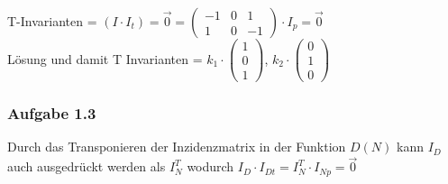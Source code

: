 \documentclass[10pt]{scrartcl}
\begin{document}
		T-Invarianten = $(I \cdotp I_t) = \overrightarrow{0} = \begin{pmatrix} 
						 -1 & 0 & 1 \\
						 1 & 0 & -1 \end{pmatrix} \cdotp I_p = \overrightarrow{0}$\\
		
		Lösung und damit T Invarianten = $k_1 \cdotp \begin{pmatrix} 
						 1 \\
						 0 \\
						 1 \end{pmatrix}$, $k_2 \cdotp \begin{pmatrix} 
						 0 \\
						 1 \\
						 0 \end{pmatrix}$\\
						 
	\subsubsection{Aufgabe 1.3}
	Durch das Transponieren der Inzidenzmatrix in der Funktion $D(N)$ kann $I_D$ auch ausgedrückt werden als $I_N^T$ wodurch $I_D \cdot I_{Dt} = I_N^T \cdot I_{Np} = \overrightarrow{0}$
	
\end{document}
